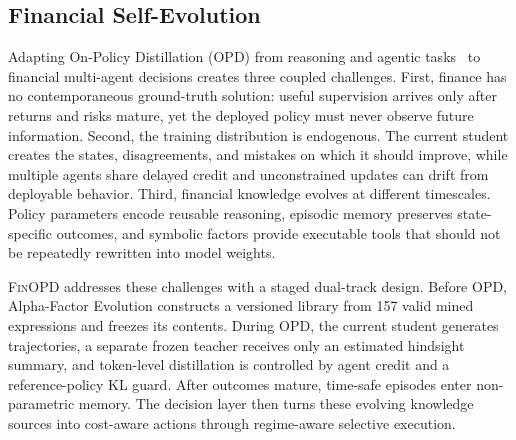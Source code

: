 \subsection{Financial Self-Evolution}

Adapting On-Policy Distillation (OPD) from reasoning and agentic tasks~\cite{selfdistilledreasoner2026,rgopd2026,seed2026} to financial multi-agent decisions creates three coupled challenges. First, finance has no contemporaneous ground-truth solution: useful supervision arrives only after returns and risks mature, yet the deployed policy must never observe future information. Second, the training distribution is endogenous. The current student creates the states, disagreements, and mistakes on which it should improve, while multiple agents share delayed credit and unconstrained updates can drift from deployable behavior. Third, financial knowledge evolves at different timescales. Policy parameters encode reusable reasoning, episodic memory preserves state-specific outcomes, and symbolic factors provide executable tools that should not be repeatedly rewritten into model weights.

\textsc{FinOPD} addresses these challenges with a staged dual-track design. Before OPD, Alpha-Factor Evolution constructs a versioned library from 157 valid mined expressions and freezes its contents. During OPD, the current student generates trajectories, a separate frozen teacher receives only an estimated hindsight summary, and token-level distillation is controlled by agent credit and a reference-policy KL guard. After outcomes mature, time-safe episodes enter non-parametric memory. The decision layer then turns these evolving knowledge sources into cost-aware actions through regime-aware selective execution.
